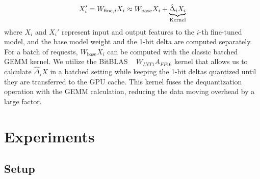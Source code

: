 \documentclass[numbers]{article}
\begin{document}
\begin{equation}
    X'_i = W_{\text{fine}, i}X_i \approx W_{\text{base}}X_i + \underbrace{ \hat{\Delta}_iX_i}_{\text{\color{black}{\text{Kernel}}}}
    \label{eqn:kernel_decomp}
\end{equation}
where $X_i$ and $X_i'$ represent input and output features to the $i$-th fine-tuned model, and the base model weight and the 1-bit delta are computed separately. For a batch of requests, $W_{\text{base}}X_i$ can be computed with the classic batched GEMM kernel. We utilize the BitBLAS ~\citep{ladder-osdi24} $W_{INT1}A_{FP16}$ kernel that allows us to calculate $\hat{\Delta}_iX$ in a batched setting while keeping the 1-bit deltas quantized until they are transferred to the GPU cache. This kernel fuses the dequantization operation with the GEMM calculation, reducing the data moving overhead by a large factor.






\section{Experiments}
\label{sec:experiments}

\subsection{Setup}
\label{sec:setup}
\end{document}
